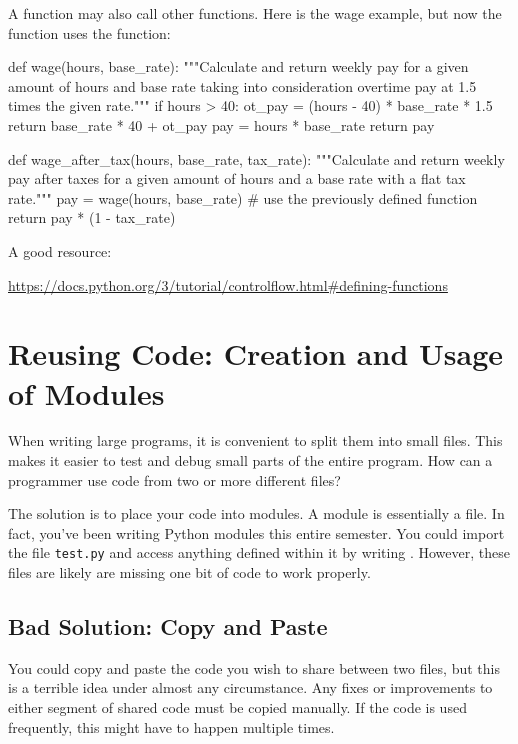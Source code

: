 \documentclass[11pt]{cselabheader}
\begin{document}
{\begin{pyconcode}
\end{pyconcode}


A function may also call other functions. Here is the wage example,
but now the  function uses the 
function:

\begin{python3code}
def wage(hours, base_rate):
    """Calculate and return weekly pay for a given amount of hours and base rate taking
    into consideration overtime pay at 1.5 times the given rate."""
    if hours > 40:
        ot_pay = (hours - 40) * base_rate * 1.5
        return base_rate * 40 + ot_pay
    pay = hours * base_rate
    return pay

def wage_after_tax(hours, base_rate, tax_rate):
    """Calculate and return weekly pay after taxes for a given amount of hours and a
    base rate with a flat tax rate."""
    pay = wage(hours, base_rate)  # use the previously defined function
    return pay * (1 - tax_rate)
\end{python3code}

A good resource:

\begin{center}
\url{https://docs.python.org/3/tutorial/controlflow.html#defining-functions}
\end{center}


\section{Reusing Code: Creation and Usage of Modules}

When writing large programs, it is convenient to split them
into small files. This makes it easier to test and debug small parts
of the entire program.  How can a programmer use code from two or more
different  files?

The solution is to place your code into modules.  A module is
essentially a  file. In fact, you've been writing
Python modules this entire semester.  You could import the file
\texttt{test.py} and access anything defined within it by writing
.  However, these files are likely are
missing one bit of code to work properly.

\subsection{Bad Solution: Copy and Paste}

You could copy and paste the code you wish to share between two
 files, but this is a terrible idea under almost any
circumstance.  Any fixes or improvements to either segment of shared
code must be copied manually.  If the code is used frequently, this
might have to happen multiple times.

}
\end{document}

